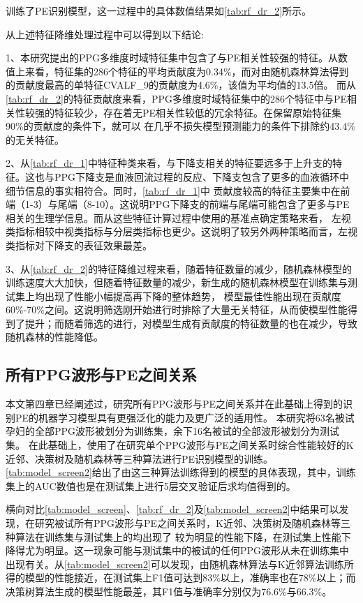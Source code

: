 \noindent
训练了PE识别模型，这一过程中的具体数值结果如\autoref{tab:rf_dr_2}所示。

从上述特征降维处理过程中可以得到以下结论:

1、本研究提出的PPG多维度时域特征集中包含了与PE相关性较强的特征。从数值上来看，特征集的286个特征的平均贡献度为0.34\%，而对由随机森林算法得到的贡献度最高的单特征CVALF\_9的贡献度为4.6\%，该值为平均值的13.5倍。
而从\autoref{tab:rf_dr_2}的特征贡献度来看，PPG多维度时域特征集中的286个特征中与PE相关性较强的特征较少，存在着无PE相关性较低的冗余特征。在保留原始特征集90\%的贡献度的条件下，就可以
在几乎不损失模型预测能力的条件下排除约43.4\%的无关特征。

2、从\autoref{tab:rf_dr_1}中特征种类来看，与下降支相关的特征要远多于上升支的特征。这也与PPG下降支是血液回流过程的反应、下降支包含了更多的血液循环中细节信息的事实相符合。同时，\autoref{tab:rf_dr_1}中
贡献度较高的特征主要集中在前端（1-3）与尾端（8-10）。这说明PPG下降支的前端与尾端可能包含了更多与PE相关的生理学信息。而从这些特征计算过程中使用的基准点确定策略来看，
左视类指标相较中视类指标与分层类指标也更少。这说明了较另外两种策略而言，左视类指标对下降支的表征效果最差。

3、从\autoref{tab:rf_dr_2}的特征降维过程来看，随着特征数量的减少，随机森林模型的训练速度大大加快，但随着特征数量的减少，新生成的随机森林模型在训练集与测试集上均出现了性能小幅提高再下降的整体趋势，
模型最佳性能出现在贡献度60\%-70\%之间。这说明筛选刚开始进行时排除了大量无关特征，从而使模型性能得到了提升；而随着筛选的进行，对模型生成有贡献度的特征数量的也在减少，导致随机森林的性能降低。

\subsection{所有PPG波形与PE之间关系}

本文第四章已经阐述过，研究所有PPG波形与PE之间关系并在此基础上得到的识别PE的机器学习模型具有更强泛化的能力及更广泛的适用性。
本研究将63名被试孕妇的全部PPG波形被划分为训练集，余下16名被试的全部波形被划分为测试集。
在此基础上，使用了在研究单个PPG波形与PE之间关系时综合性能较好的K近邻、决策树及随机森林等三种算法进行PE识别模型的训练。
\autoref{tab:model_screen2}给出了由这三种算法训练得到的模型的具体表现，其中，训练集上的AUC数值也是在测试集上进行5层交叉验证后求均值得到的。

横向对比\autoref{tab:model_screen}、\autoref{tab:rf_dr_2}及\autoref{tab:model_screen2}中结果可以发现，在研究被试所有PPG波形与PE之间关系时，K近邻、决策树及随机森林等三种算法在训练集与测试集上的均出现了
较为明显的性能下降，在测试集上性能下降得尤为明显。这一现象可能与测试集中的被试的任何PPG波形从未在训练集中出现有关。从\autoref{tab:model_screen2}可以发现，由随机森林算法与K近邻算法训练所得的模型的性能接近，在测试集上F1值可达到83\%以上，准确率也在78\%以上；而决策树算法生成的模型性能最差，其F1值与准确率分别仅为76.6\%与66.3\%。

